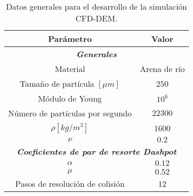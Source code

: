 \begin{table}[h!]
	\centering
	\begin{adjustbox}{max width = 0.8\textwidth}
	\begin{tabular}{|c|c|}
		\hline
		\textbf{Par\'ametro} & \textbf{Valor} \\ \hline
		\multicolumn{2}{|c|}{\textbf{\textit{Generales}}} \\ \hline
		Material & Arena de r\'io \\ \hline
		Tama\~no de part\'icula $[\mu m]$ & 250 \\ \hline
		M\'odulo de Young & $10 ^6$ \\ \hline
		 N\'umero de part\'iculas por segundo & $22300$ \\
		  \hline
		 $\rho [kg/m^3]$ & 1600 \\ \hline
		 $\nu$ & $0.2$ \\ \hline
		 \multicolumn{2}{|c|}{\textbf{\textit{Coeficientes de par de resorte Dashpot}}} \\ \hline
		 $\alpha$ & $0.12$ \\ \hline
		 $\mu$ & $0.52$ \\ \hline
		 Pasos de resoluci\'on de colisi\'on & 12 \\ \hline
	\end{tabular}
	\end{adjustbox}
	\caption{Datos generales para el desarrollo de la simulaci\'on CFD-DEM.}
	\label{CFDEMdata}
\end{table}

